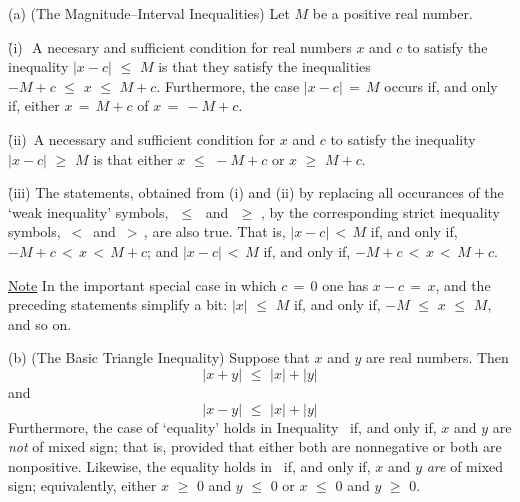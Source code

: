 \V

\hspace*{\parindent} (a) (The Magnitude--Interval Inequalities) Let $M$ be a positive real number.

            \h (i)\,\, A necesary and sufficient condition for real numbers $x$ and $c$ to satisfy the inequality $|x-c|\,\,{\leq}\,\,M$ is that they satisfy the inequalities $-M+c\,\,{\leq}\,\,x\,\,{\leq}\,\,M+c$.
    Furthermore, the case $|x-c| \,=\, M$ occurs if, and only if, either $x \,=\, M+c$ of $x \,=\, -M+c$.

            \h (ii)\, A necessary and sufficient condition for $x$ and $c$ to satisfy the inequality $|x-c|\,\,{\geq}\,\,M$ is that either $x\,\,{\leq}\,\,-M+c$ or $x\,\,{\geq}\,\,M+c$.


            \h (iii) The statements, obtained from (i) and (ii) by replacing all occurances of the `weak inequality' symbols, $\,\,{\leq}\,\,$ and $\,\,{\geq}\,\,$, by the corresponding strict inequality symbols, $\,<\,$ and $\,>\,$, are also true.
    That is, $|x-c|\,<\,M$ if, and only if, $-M+c\,<\,x\,<\,M+c$;
    and $|x-c|\,<\,M$ if, and only if, $-M+c\,<\,x\,<\,M+c$.

        \underline{Note} In the important special case in which $c \,=\, 0$ one has $x-c \,=\, x$, and the preceding statements simplify a bit:
    $|x|\,\,{\leq}\,\,M$ if, and only if, $-M\,\,{\leq}\,\,x\,\,{\leq}\,\,M$, and so on.

\V

        (b) (The Basic Triangle Inequality) Suppose that $x$ and $y$ are real numbers.
    Then
        \begin{equation}
        \label{IneqB.35AA}
        |x+y|\,\,{\leq}\,\,|x| + |y|
        \end{equation}
    and
        \begin{equation}
        \label{IneqB.35AB}
        |x-y|\,\,{\leq}\,\,|x| + |y|
        \end{equation}
      Furthermore, the case of `equality' holds in Inequality~ if, and only if,
    $x$ and $y$ are {\em not} of mixed sign; that is, provided that either both are nonnegative or both are nonpositive.
    Likewise, the equality holds in~ if, and only if, $x$ and $y$ {\em are} of mixed sign; equivalently, either $x\,\,{\geq}\,\,0$ and $y\,\,{\leq}\,\,0$ or $x\,\,{\leq}\,\,0$ and $y\,\,{\geq}\,\,0$.

